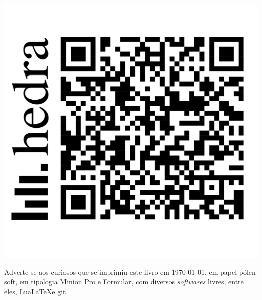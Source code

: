 \pagebreak

\ifodd\thepage\blankpage\fi

\mbox{}\vfill

\begin{center}
	\includegraphics[width=.3\textwidth]{img/hedra-audio-qr.png}
\end{center}

\vfill

\begin{center}
		\begin{minipage}{.7\textwidth}\tiny\noindent{}
		\centering\tiny
		Adverte-se aos curiosos que se imprimiu este 
		livro %
		em \today{}, em papel pólen soft, em tipologia Minion Pro e Formular, 
		com diversos \emph{softwares} livres, 
		entre eles, Lua\LaTeX e git.\\ 
		\medskip\\\
		\end{minipage}
\end{center}